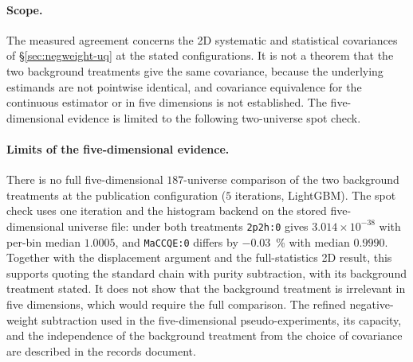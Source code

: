 \paragraph{Scope.} The measured agreement concerns the 2D systematic and statistical covariances of \S\ref{sec:negweight-uq} at the stated configurations. It is not a theorem that the two background treatments give the same covariance, because the underlying estimands are not pointwise identical, and covariance equivalence for the continuous estimator or in five dimensions is not established. The five-dimensional evidence is limited to the following two-universe spot check.

\paragraph{Limits of the five-dimensional evidence.} There is no full five-dimensional $187$-universe comparison of the two background treatments at the publication configuration ($5$ iterations, LightGBM). The spot check uses one iteration and the histogram backend on the stored five-dimensional universe file: under both treatments \texttt{2p2h:0} gives $3.014\times10^{-38}$ with per-bin median $1.0005$, and \texttt{MaCCQE:0} differs by \SI{-0.03}{\percent} with median $0.9990$. Together with the displacement argument and the full-statistics 2D result, this supports quoting the standard chain with purity subtraction, with its background treatment stated. It does not show that the background treatment is irrelevant in five dimensions, which would require the full comparison. The refined negative-weight subtraction used in the five-dimensional pseudo-experiments, its capacity, and the independence of the background treatment from the choice of covariance are described in the records document.


